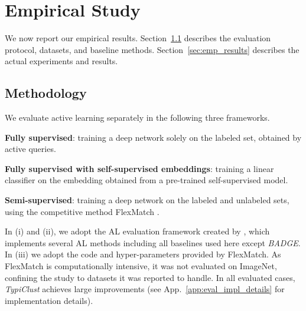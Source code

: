 \documentclass{article}
\newcommand{\app}{App.}
\begin{document}
\section{Empirical Study}
\label{sec:emp}


We now report our empirical results. Section~\ref{sec:methodology} describes the evaluation protocol, datasets, and baseline methods. Section~\ref{sec:emp_results} describes the actual experiments and results.

\subsection{Methodology}
\label{sec:methodology}
We evaluate active learning separately in the following three frameworks.  \begin{inparaenum}[(i)] 
\item \textbf{Fully supervised}: training a deep network solely on the labeled set, obtained by active queries.
\item \textbf{Fully supervised with self-supervised embeddings}: training a linear classifier on the embedding obtained from a pre-trained self-supervised model. 
\item \textbf{Semi-supervised}: training a deep network on the labeled and unlabeled sets, using the competitive method FlexMatch \cite{DBLP:journals/corr/abs-2110-08263}.\end{inparaenum} 

In (i) and (ii), we adopt the AL evaluation framework created by \citet{Munjal2020TowardsRA}, which implements several AL methods including all baselines used here except \emph{BADGE}. In (iii) we adopt the code and hyper-parameters provided by FlexMatch. As FlexMatch is computationally intensive, it was not evaluated  on ImageNet, confining the study to datasets it was reported to handle. In all evaluated cases, \emph{TypiClust} achieves large improvements
(see \app~\ref{app:eval_impl_details} for implementation details). 
\end{document}
